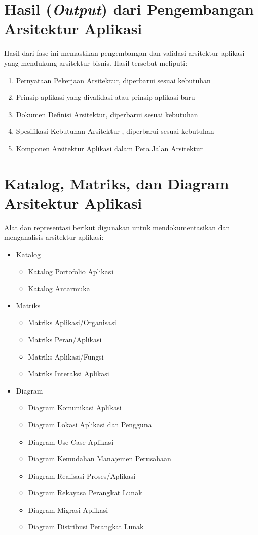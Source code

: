 \section{Hasil (\textit{Output}) dari Pengembangan Arsitektur Aplikasi}
Hasil dari fase ini memastikan pengembangan dan validasi arsitektur aplikasi yang mendukung arsitektur bisnis. Hasil tersebut meliputi:

\begin{enumerate}
	\item Pernyataan Pekerjaan Arsitektur, diperbarui sesuai kebutuhan
	\item Prinsip aplikasi yang divalidasi atau prinsip aplikasi baru
	\item Dokumen Definisi Arsitektur, diperbarui sesuai kebutuhan
	\item Spesifikasi Kebutuhan Arsitektur , diperbarui sesuai kebutuhan
	\item Komponen Arsitektur Aplikasi dalam Peta Jalan Arsitektur
\end{enumerate}

\section{Katalog, Matriks, dan Diagram Arsitektur Aplikasi}
Alat dan representasi berikut digunakan untuk mendokumentasikan dan menganalisis arsitektur aplikasi:

\begin{itemize}
\item Katalog
\begin{itemize}
	\item Katalog Portofolio Aplikasi
	\item Katalog Antarmuka
\end{itemize}

\item Matriks
\begin{itemize}
	\item Matriks Aplikasi/Organisasi
	\item Matriks Peran/Aplikasi
	\item Matriks Aplikasi/Fungsi
	\item Matriks Interaksi Aplikasi
\end{itemize}

\item Diagram
\begin{itemize}
	\item Diagram Komunikasi Aplikasi
	\item Diagram Lokasi Aplikasi dan Pengguna
	\item Diagram Use-Case Aplikasi
	\item Diagram Kemudahan Manajemen Perusahaan
	\item Diagram Realisasi Proses/Aplikasi
	\item Diagram Rekayasa Perangkat Lunak
	\item Diagram Migrasi Aplikasi
	\item Diagram Distribusi Perangkat Lunak
\end{itemize}

\end{itemize}


